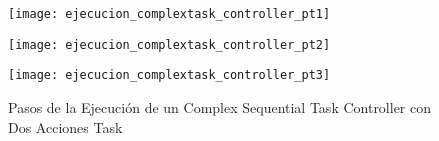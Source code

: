 \begin{figure}[H]
	\centering
	\texttt{[image: ejecucion\_complextask\_controller\_pt1]}
\end{figure}

\begin{figure}[H]
	\centering
	\texttt{[image: ejecucion\_complextask\_controller\_pt2]}
\end{figure}

\begin{figure}[H]
	\centering
	\texttt{[image: ejecucion\_complextask\_controller\_pt3]}
	\caption{Pasos de la Ejecución de un Complex Sequential Task Controller con
	Dos Acciones Task}
	\label{fig:ejecucion_complextask_controller}
\end{figure}